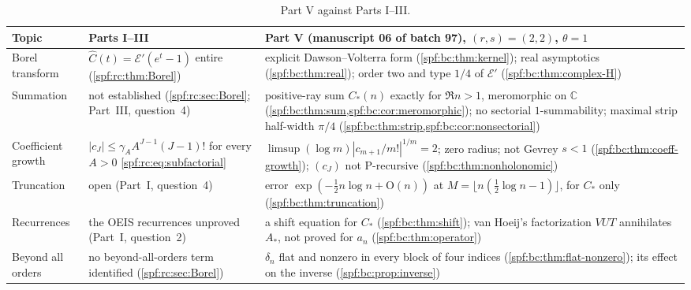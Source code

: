 \documentclass[11pt]{article}
\numberwithin{equation}{section}
\theoremstyle{definition}
\theoremstyle{remark}
\theoremstyle{definition}
\newcommand{\bigO}{\mathrm O}
\newcommand{\bcC}{C_{\!*}}
\newcommand{\bcA}{A_{\!*}}
\begin{document}
\begin{table}[htbp]
\centering\small
\renewcommand{\arraystretch}{1.15}
\begin{tabular}{@{}>{\raggedright\arraybackslash}p{}>{\raggedright\arraybackslash}p{}>{\raggedright\arraybackslash}p{}@{}}
\toprule
Topic & Parts I--III & Part V (manuscript 06 of batch 97), $(r,s)=(2,2)$, $\theta=1$\\
\midrule
Borel transform &
$\widehat C(t)=\mathcal E'(e^t-1)$ entire (\cref{spf:rc:thm:Borel}) &
explicit Dawson--Volterra form (\cref{spf:bc:thm:kernel}); real asymptotics
(\cref{spf:bc:thm:real}); order two and type $1/4$ of $\mathcal E'$
(\cref{spf:bc:thm:complex-H})\\
Summation &
not established (\cref{spf:rc:sec:Borel}; Part~III, question~4) &
positive-ray sum $\bcC(n)$ exactly for $\Re n>1$, meromorphic on $\mathbb C$
(\cref{spf:bc:thm:sum,spf:bc:cor:meromorphic}); no sectorial
$1$-summability; maximal strip half-width $\pi/4$
(\cref{spf:bc:thm:strip,spf:bc:cor:nonsectorial})\\
Coefficient growth &
$|c_J|\le\gamma_AA^{J-1}(J-1)!$ for every $A>0$
\eqref{spf:rc:eq:subfactorial} &
$\limsup(\log m)|c_{m+1}/m!|^{1/m}=2$; zero radius; not Gevrey $s<1$
(\cref{spf:bc:thm:coeff-growth}); $(c_J)$ not P-recursive
(\cref{spf:bc:thm:nonholonomic})\\
Truncation &
open (Part~I, question~4) &
error $\exp(-\frac12n\log n+\bigO(n))$ at $M=\lfloor n(\frac12\log n-1)\rfloor$, for
$\bcC$ only (\cref{spf:bc:thm:truncation})\\
Recurrences &
the OEIS recurrences unproved (Part~I, question~2) &
a shift equation for $\bcC$ (\cref{spf:bc:thm:shift}); van Hoeij's
factorization $VUT$ annihilates $\bcA$, not proved for $a_n$
(\cref{spf:bc:thm:operator})\\
Beyond all orders &
no beyond-all-orders term identified (\cref{spf:rc:sec:Borel}) &
$\delta_n$ flat and nonzero in every block of four indices
(\cref{spf:bc:thm:flat-nonzero}); its effect on the inverse
(\cref{spf:bc:prop:inverse})\\
\bottomrule
\end{tabular}
\caption{Part V against Parts I--III.}
\label{spf:bc:tab:claims}
\end{table}
\end{document}
